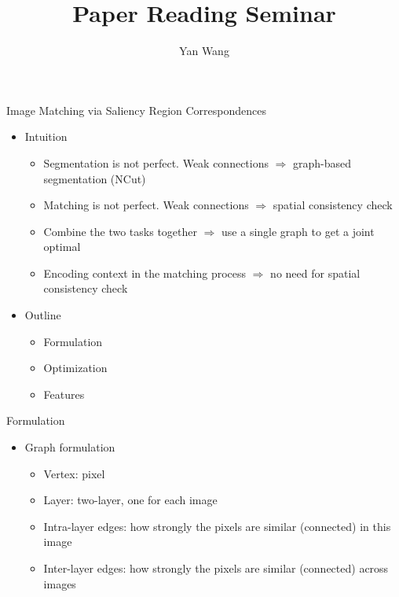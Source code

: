 \documentclass[12pt]{beamer}
\author{Yan Wang}
\title{Paper Reading Seminar}
\subtitle{}
\begin{document}
\begin{frame}[plain]
    \titlepage
\end{frame}

\begin{frame}{Image Matching via Saliency Region Correspondences}
    \begin{itemize}
        \item Intuition
        \begin{itemize}
            \item Segmentation is not perfect. Weak connections $\Rightarrow$ graph-based segmentation (NCut)
            \item Matching is not perfect. Weak connections $\Rightarrow$ spatial consistency check
            \item Combine the two tasks together $\Rightarrow$ use a single graph to get a joint optimal
            \item Encoding context in the matching process $\Rightarrow$ no need for spatial consistency check
        \end{itemize}
        \item Outline
        \begin{itemize}
            \item Formulation
            \item Optimization
            \item Features
        \end{itemize}
    \end{itemize}
\end{frame}

\begin{frame}{Formulation}
    \begin{itemize}
        \item Graph formulation
        \begin{itemize}
            \item Vertex: pixel
            \item Layer: two-layer, one for each image
            \item Intra-layer edges: how strongly the pixels are similar (connected) in this image
            \item Inter-layer edges: how strongly the pixels are similar (connected) across images
            \\  
        \end{itemize}
    \end{itemize}
\end{frame}
\end{document}
